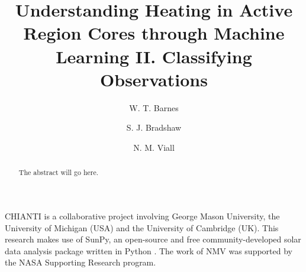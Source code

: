 \documentclass[modern,linenumbers]{aastex62}
\begin{document}
\title{Understanding Heating in Active Region Cores through Machine Learning II. Classifying Observations}
\author[0000-0001-9642-6089]{W. T. Barnes}
\author{S. J. Bradshaw}
\author{N. M. Viall}
\begin{abstract}
The abstract will go here.
\end{abstract}





\acknowledgments
CHIANTI is a collaborative project involving George Mason University, the University of Michigan (USA) and the University of Cambridge (UK). This research makes use of SunPy, an open-source and free community-developed solar data analysis package written in Python \citep{sunpy_community_sunpypython_2015}. The work of NMV was supported by the NASA Supporting Research program.
\end{document}
